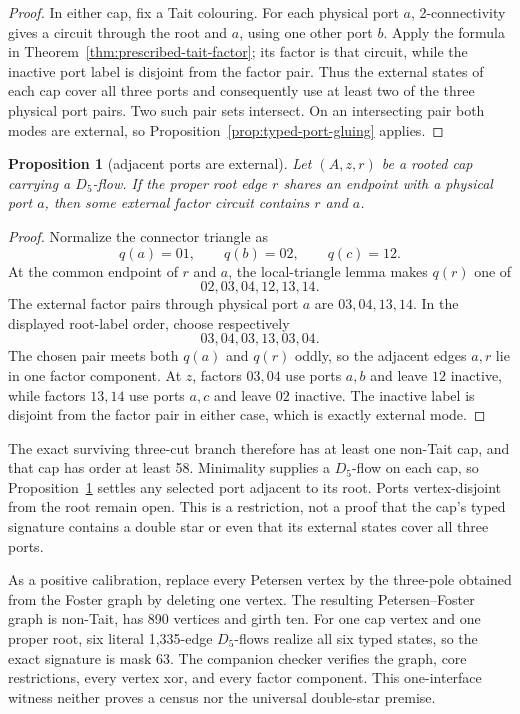 \documentclass[11pt]{article}
\newtheorem{proposition}[theorem]{Proposition}
\theoremstyle{definition}
\theoremstyle{remark}
\begin{document}
\begin{proof}
In either cap, fix a Tait colouring.  For each physical port $a$,
2-connectivity gives a circuit through the root and $a$, using one other
port $b$.  Apply the formula in
Theorem~\ref{thm:prescribed-tait-factor}; its factor is that circuit, while
the inactive port label is disjoint from the factor pair.  Thus the external
states of each cap cover all three ports and consequently use at least two
of the three physical port pairs.  Two such pair sets intersect.  On an
intersecting pair both modes are external, so
Proposition~\ref{prop:typed-port-gluing} applies.
\end{proof}

\begin{proposition}[adjacent ports are external]
\label{prop:adjacent-port-external}
Let \((A,z,r)\) be a rooted cap carrying a \(D_5\)-flow.  If the proper
root edge \(r\) shares an endpoint with a physical port \(a\), then some
external factor circuit contains \(r\) and \(a\).
\end{proposition}

\begin{proof}
Normalize the connector triangle as
\[
                 q(a)=01,\qquad q(b)=02,\qquad q(c)=12.
\]
At the common endpoint of \(r\) and \(a\), the local-triangle lemma makes
\(q(r)\) one of
\[
                         02,03,04,12,13,14.
\]
The external factor pairs through physical port \(a\) are
\(03,04,13,14\).  In the displayed root-label order, choose respectively
\[
                         03,04,03,13,03,04.
\]
The chosen pair meets both \(q(a)\) and \(q(r)\) oddly, so the adjacent
edges \(a,r\) lie in one factor component.  At \(z\), factors \(03,04\)
use ports \(a,b\) and leave \(12\) inactive, while factors \(13,14\) use
ports \(a,c\) and leave \(02\) inactive.  The inactive label is disjoint
from the factor pair in either case, which is exactly external mode.
\end{proof}

The exact surviving three-cut branch therefore has at least one non-Tait
cap, and that cap has order at least 58.  Minimality supplies a \(D_5\)-flow
on each cap, so Proposition~\ref{prop:adjacent-port-external} settles any
selected port adjacent to its root.  Ports vertex-disjoint from the root
remain open.  This is a restriction, not a proof that the cap's typed
signature contains a double star or even that its external states cover
all three ports.

As a positive calibration, replace every Petersen vertex by the three-pole
obtained from the Foster graph by deleting one vertex.  The resulting
Petersen--Foster graph is non-Tait, has 890 vertices and girth ten.  For one
cap vertex and one proper root, six literal 1,335-edge $D_5$-flows realize
all six typed states, so the exact signature is mask 63.  The companion
checker verifies the graph, core restrictions, every vertex xor, and every
factor component.  This one-interface witness neither proves a census nor
the universal double-star premise.
\end{document}
